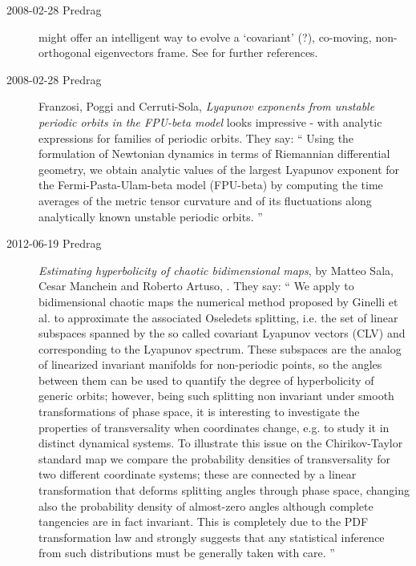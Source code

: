 \begin{description}
\item[2008-02-28 Predrag]  might offer an
intelligent way to evolve a `covariant' (?), co-moving, non-orthogonal
{\jacobianM} eigenvectors frame. See  for
further references.

\item[2008-02-28 Predrag]
Franzosi, Poggi and Cerruti-Sola,
{\em Lyapunov exponents from unstable periodic orbits
  in the {FPU}-beta model}
looks impressive -
    with analytic expressions for families of periodic orbits. They say:
    ``
Using the formulation of Newtonian dynamics in terms of Riemannian
differential geometry, we obtain analytic values of the largest
Lyapunov exponent for the Fermi-Pasta-Ulam-beta model (FPU-beta) by
computing the time averages of the metric tensor curvature and of its
fluctuations along analytically known unstable periodic orbits.
    ''

\item[2012-06-19 Predrag]
{\em Estimating hyperbolicity of chaotic bidimensional maps}, by Matteo
Sala, Cesar Manchein and Roberto Artuso, . They say: ``
We apply to bidimensional chaotic maps the numerical method proposed by
Ginelli et al. to approximate the associated Oseledets splitting, i.e.
the set of linear subspaces spanned by the so called covariant Lyapunov
vectors (CLV) and corresponding to the Lyapunov spectrum. These subspaces
are the analog of linearized invariant manifolds for non-periodic points,
so the angles between them can be used to quantify the degree of
hyperbolicity of generic orbits; however, being such splitting non
invariant under smooth transformations of phase space, it is interesting
to investigate the properties of transversality when coordinates change,
e.g. to study it in distinct dynamical systems. To illustrate this issue
on the Chirikov-Taylor standard map we compare the probability densities
of transversality for two different coordinate systems; these are
connected by a linear transformation that deforms splitting angles
through phase space, changing also the probability density of almost-zero
angles although complete tangencies are in fact invariant. This is
completely due to the PDF transformation law and strongly suggests that
any statistical inference from such distributions must be generally taken
with care.
''



\end{description}

\renewcommand{\ssp}{a}
